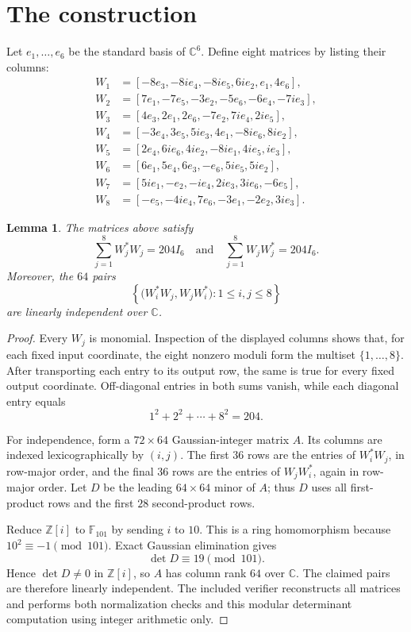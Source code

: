 \documentclass[11pt]{article}
\newtheorem{lemma}[theorem]{Lemma}
\theoremstyle{remark}
\newcommand{\C}{\mathbb C}
\begin{document}
\section{The construction}

Let \(e_1,\ldots,e_6\) be the standard basis of \(\C^6\).  Define eight
matrices by listing their columns:
\small
\begin{align*}
W_1&=[-8e_3,-8ie_4,-8ie_5,6ie_2,e_1,4e_6],\\
W_2&=[7e_1,-7e_5,-3e_2,-5e_6,-6e_4,-7ie_3],\\
W_3&=[4e_3,2e_1,2e_6,-7e_2,7ie_4,2ie_5],\\
W_4&=[-3e_4,3e_5,5ie_3,4e_1,-8ie_6,8ie_2],\\
W_5&=[2e_4,6ie_6,4ie_2,-8ie_1,4ie_5,ie_3],\\
W_6&=[6e_1,5e_4,6e_3,-e_6,5ie_5,5ie_2],\\
W_7&=[5ie_1,-e_2,-ie_4,2ie_3,3ie_6,-6e_5],\\
W_8&=[-e_5,-4ie_4,7e_6,-3e_1,-2e_2,3ie_3].
\end{align*}
\normalsize

\begin{lemma}\label{lem:certificate}
The matrices above satisfy
\[
 \sum_{j=1}^8W_j^*W_j=204I_6
 \quad\text{and}\quad
 \sum_{j=1}^8W_jW_j^*=204I_6.
\]
Moreover, the \(64\) pairs
\[
 \left\{\bigl(W_i^*W_j,W_jW_i^*\bigr):1\le i,j\le8\right\}
\]
are linearly independent over \(\C\).
\end{lemma}

\begin{proof}
Every \(W_j\) is monomial.  Inspection of the displayed columns shows that,
for each fixed input coordinate, the eight nonzero moduli form the multiset
\(\{1,\ldots,8\}\).  After transporting each entry to its output row, the
same is true for every fixed output coordinate.  Off-diagonal entries in
both sums vanish, while each diagonal entry equals
\[
 1^2+2^2+\cdots+8^2=204.
\]

For independence, form a \(72\times64\) Gaussian-integer matrix \(A\).
Its columns are indexed lexicographically by \((i,j)\).  The first \(36\)
rows are the entries of \(W_i^*W_j\), in row-major order, and the final
\(36\) rows are the entries of \(W_jW_i^*\), again in row-major order.
Let \(D\) be the leading \(64\times64\) minor of \(A\); thus \(D\) uses all
first-product rows and the first \(28\) second-product rows.

Reduce \(\mathbb Z[i]\) to \(\mathbb F_{101}\) by sending \(i\) to \(10\).
This is a ring homomorphism because \(10^2\equiv-1\pmod{101}\).  Exact
Gaussian elimination gives
\[
 \det D\equiv19\pmod{101}.
\]
Hence \(\det D\ne0\) in \(\mathbb Z[i]\), so \(A\) has column rank \(64\)
over \(\C\).  The claimed pairs are therefore linearly independent.  The
included verifier reconstructs all matrices and performs both normalization
checks and this modular determinant computation using integer arithmetic
only.
\end{proof}
\end{document}
